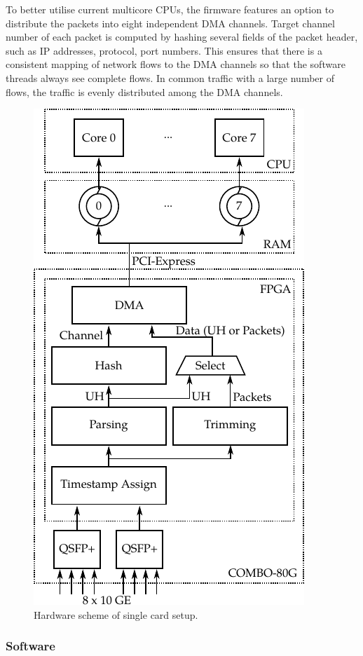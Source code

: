 To better utilise current multicore CPUs, the firmware features an option to distribute the packets into eight independent DMA channels. Target channel number of each packet is computed by hashing several fields of the packet header, such as IP addresses, protocol, port numbers. This ensures that there is a consistent mapping of network flows to the DMA channels so that the software threads always see complete flows. In common traffic with a large number of flows, the traffic is evenly distributed among the DMA channels.

\begin{figure}[t]
    \centering 
    \includegraphics{figures/paper-highdensity/fig/hw}
    \caption{Hardware scheme of single card setup.}
    \label{fig:hw}
\end{figure}

\subsubsection{Software}


